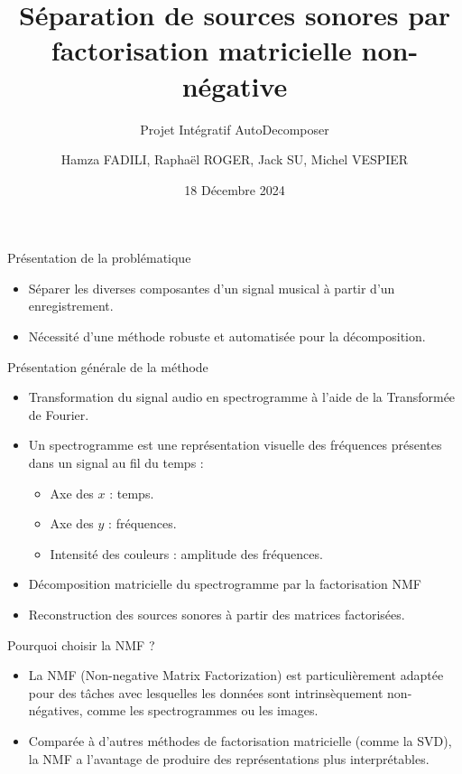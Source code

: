 \documentclass{beamer}
\title{Séparation de sources sonores par factorisation matricielle non-négative}
\subtitle{Projet Intégratif AutoDecomposer}
\author{Hamza FADILI, Raphaël ROGER, Jack SU, Michel VESPIER}
\date{18 Décembre 2024}
\begin{document}
\begin{frame}
    \titlepage
\end{frame}

\begin{frame}{Présentation de la problématique}
    \begin{itemize}
        \item Séparer les diverses composantes d'un signal musical à partir d'un enregistrement.
        \item Nécessité d'une méthode robuste et automatisée pour la décomposition.
    \end{itemize}
\end{frame}

\begin{frame}{Présentation générale de la méthode}
    \begin{itemize}
        \item Transformation du signal audio en spectrogramme à l'aide de la Transformée de Fourier.
        \item Un spectrogramme est une représentation visuelle des fréquences présentes dans un signal au fil du temps :
        \begin{itemize}
            \item Axe des $x$ : temps.
            \item Axe des $y$ : fréquences.
            \item Intensité des couleurs : amplitude des fréquences.
        \end{itemize}
        \item Décomposition matricielle du spectrogramme par la factorisation NMF
        \item Reconstruction des sources sonores à partir des matrices factorisées.
    \end{itemize}
\end{frame}

\begin{frame}{Pourquoi choisir la NMF ?}
    \begin{itemize}
        \item La NMF (Non-negative Matrix Factorization) est particulièrement adaptée pour des tâches avec lesquelles les données sont intrinsèquement non-négatives, comme les spectrogrammes ou les images.
        \item Comparée à d'autres méthodes de factorisation matricielle (comme la SVD), la NMF a l'avantage de produire des représentations plus interprétables.
    \end{itemize}
\end{frame}
\end{document}
